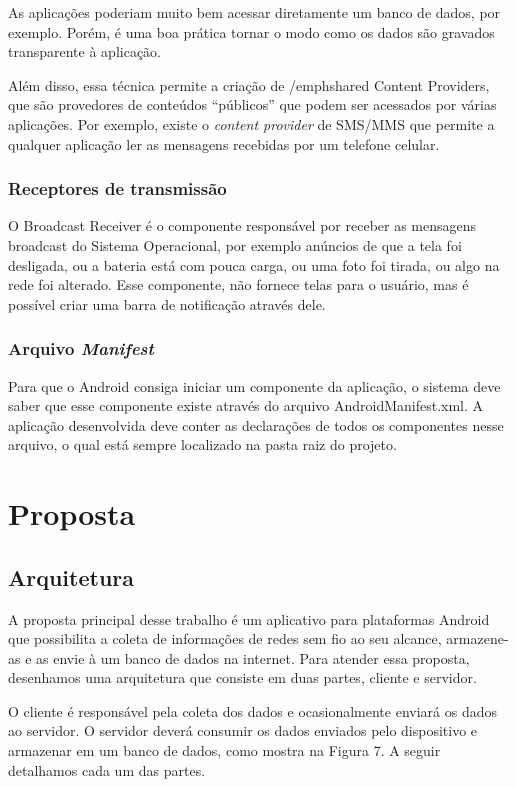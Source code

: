 \documentclass[12pt, %
openright, 
oneside,
a4paper,
brazil]{facom-ufu-abntex2}
\begin{document}
As aplicações poderiam muito bem acessar diretamente um banco de dados, por exemplo. Porém, é uma boa prática tornar o modo como os dados são gravados transparente à aplicação. 

Além disso, essa técnica permite a criação de /emph{shared Content Providers}, que são provedores de conteúdos “públicos” que podem ser acessados por várias aplicações. Por exemplo, existe o \emph{content provider} de SMS/MMS que permite a qualquer aplicação ler as mensagens recebidas por um telefone celular.

	\subsection{Receptores de transmissão}
	O Broadcast Receiver é o componente responsável por receber as mensagens broadcast do Sistema Operacional, por exemplo anúncios de que a tela foi desligada, ou a bateria está com pouca carga, ou uma foto foi tirada, ou algo na rede foi alterado. Esse componente, não fornece telas para o usuário, mas é possível criar uma barra de notificação através dele.

	\subsection{Arquivo \emph{Manifest}}
	Para que o Android consiga iniciar um componente da aplicação, o sistema deve saber que esse componente existe através do arquivo AndroidManifest.xml. A aplicação desenvolvida deve conter as declarações de todos os componentes nesse arquivo, o qual está sempre localizado na pasta raiz do projeto.		


\chapter{Proposta}


\section{Arquitetura}
A proposta principal desse trabalho é um aplicativo para plataformas Android que possibilita a coleta de informações de redes sem fio ao seu alcance, armazene-as e as envie à um banco de dados na internet. Para atender essa proposta, desenhamos uma arquitetura que consiste em duas partes, cliente e servidor.

 O cliente é responsável pela coleta dos dados e ocasionalmente enviará os dados ao servidor. O servidor deverá consumir os dados enviados pelo dispositivo  e armazenar em um banco de dados, como mostra na Figura 7.  A seguir detalhamos cada um das partes.
\end{document}
